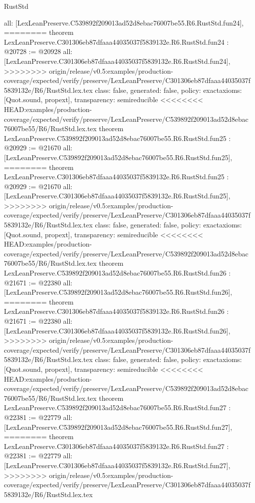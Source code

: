 \begin{lexlean}{RustStd}
\begin{coremodule}
{\begin{coremodule}
{{{{{{{{{{{{{{{{{{{{{{{{{{{  all: [LexLeanPreserve.C539892f209013ad52d8ebac76007be55.R6.RustStd.fun24],
========
theorem LexLeanPreserve.C301306eb87dfaaa44035037f5839132e.R6.RustStd.fun24 : @20728 := @20928 {
  all: [LexLeanPreserve.C301306eb87dfaaa44035037f5839132e.R6.RustStd.fun24],
>>>>>>>> origin/release/v0.5:examples/production-coverage/expected/verify/preserve/LexLeanPreserve/C301306eb87dfaaa44035037f5839132e/R6/RustStd.lex.tex
  class: false,
  generated: false,
  policy: exact{axioms: [Quot.sound, propext]},
  transparency: semireducible
}
<<<<<<<< HEAD:examples/production-coverage/expected/verify/preserve/LexLeanPreserve/C539892f209013ad52d8ebac76007be55/R6/RustStd.lex.tex
theorem LexLeanPreserve.C539892f209013ad52d8ebac76007be55.R6.RustStd.fun25 : @20929 := @21670 {
  all: [LexLeanPreserve.C539892f209013ad52d8ebac76007be55.R6.RustStd.fun25],
========
theorem LexLeanPreserve.C301306eb87dfaaa44035037f5839132e.R6.RustStd.fun25 : @20929 := @21670 {
  all: [LexLeanPreserve.C301306eb87dfaaa44035037f5839132e.R6.RustStd.fun25],
>>>>>>>> origin/release/v0.5:examples/production-coverage/expected/verify/preserve/LexLeanPreserve/C301306eb87dfaaa44035037f5839132e/R6/RustStd.lex.tex
  class: false,
  generated: false,
  policy: exact{axioms: [Quot.sound, propext]},
  transparency: semireducible
}
<<<<<<<< HEAD:examples/production-coverage/expected/verify/preserve/LexLeanPreserve/C539892f209013ad52d8ebac76007be55/R6/RustStd.lex.tex
theorem LexLeanPreserve.C539892f209013ad52d8ebac76007be55.R6.RustStd.fun26 : @21671 := @22380 {
  all: [LexLeanPreserve.C539892f209013ad52d8ebac76007be55.R6.RustStd.fun26],
========
theorem LexLeanPreserve.C301306eb87dfaaa44035037f5839132e.R6.RustStd.fun26 : @21671 := @22380 {
  all: [LexLeanPreserve.C301306eb87dfaaa44035037f5839132e.R6.RustStd.fun26],
>>>>>>>> origin/release/v0.5:examples/production-coverage/expected/verify/preserve/LexLeanPreserve/C301306eb87dfaaa44035037f5839132e/R6/RustStd.lex.tex
  class: false,
  generated: false,
  policy: exact{axioms: [Quot.sound, propext]},
  transparency: semireducible
}
<<<<<<<< HEAD:examples/production-coverage/expected/verify/preserve/LexLeanPreserve/C539892f209013ad52d8ebac76007be55/R6/RustStd.lex.tex
theorem LexLeanPreserve.C539892f209013ad52d8ebac76007be55.R6.RustStd.fun27 : @22381 := @22779 {
  all: [LexLeanPreserve.C539892f209013ad52d8ebac76007be55.R6.RustStd.fun27],
========
theorem LexLeanPreserve.C301306eb87dfaaa44035037f5839132e.R6.RustStd.fun27 : @22381 := @22779 {
  all: [LexLeanPreserve.C301306eb87dfaaa44035037f5839132e.R6.RustStd.fun27],
>>>>>>>> origin/release/v0.5:examples/production-coverage/expected/verify/preserve/LexLeanPreserve/C301306eb87dfaaa44035037f5839132e/R6/RustStd.lex.tex
}}}}}}}}}}}}}}}}}}}}}}}}}}}}}}}
\end{coremodule}}
\end{coremodule}
\end{lexlean}
